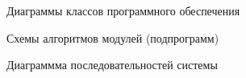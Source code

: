 {\begin{figure}[H]
    \centering
    \caption{Диаграммы классов программного обеспечения}
\end{figure}

\begin{figure}[H]
    \centering
    \caption{Схемы алгоритмов модулей (подпрограмм)}
\end{figure}

\begin{figure}[H]
    \centering
    \caption{Диаграммма последовательностей системы}
\end{figure}
}

